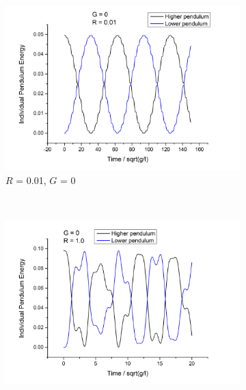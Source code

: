 \documentclass[11pt]{article}
\begin{document}
\begin{figure}[h] \label{fig:dp_energy_G0}
\vspace{-40pt}
	\caption{The energy of the individual pendulums for a range of $R$ values. The system was simulated for 100s but the plots were truncated at the point they became periodic to examine the finer details of the energy transfers.}
  \centering
  \begin{subfigure}[h]{0.65\textwidth}
    \includegraphics[width=\textwidth]{img/individual_pens/R=0-01.png}
    \captionsetup{width=0.85\textwidth}
    \caption{$R$ = 0.01, $G$ = 0}
    \label{fig:dp_e_R0.01_G0}
  \end{subfigure}%
  \\ %
  \begin{subfigure}[h]{0.65\textwidth}
    \includegraphics[width=\textwidth]{img/individual_pens/R=1.png}

\end{subfigure}
\end{figure}
\end{document}
